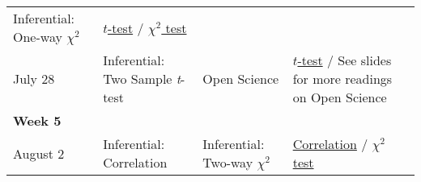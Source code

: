 \documentclass[
]{book}
\begin{document}
\begin{longtable}[]{@{}llll@{}}
\begin{minipage}[t]{0.29\columnwidth}
Inferential: One-way \(\chi^2\)\strut
\end{minipage} & \begin{minipage}[t]{0.18\columnwidth}\raggedright
\href{https://learningstatisticswithr.com/book/ttest.html}{\(t\)-test} / \href{https://learningstatisticswithr.com/book/chisquare.html}{\(\chi^2\) test}\strut
\end{minipage}\tabularnewline
\begin{minipage}[t]{0.09\columnwidth}\raggedright
July 28\strut
\end{minipage} & \begin{minipage}[t]{0.32\columnwidth}\raggedright
Inferential: Two Sample \emph{t}-test\strut
\end{minipage} & \begin{minipage}[t]{0.29\columnwidth}\raggedright
Open Science\strut
\end{minipage} & \begin{minipage}[t]{0.18\columnwidth}\raggedright
\href{https://learningstatisticswithr.com/book/ttest.html}{\(t\)-test} / See slides for more readings on Open Science\strut
\end{minipage}\tabularnewline
\begin{minipage}[t]{0.09\columnwidth}\raggedright
\textbf{Week 5}\strut
\end{minipage} & \begin{minipage}[t]{0.32\columnwidth}\raggedright
\strut
\end{minipage} & \begin{minipage}[t]{0.29\columnwidth}\raggedright
\strut
\end{minipage} & \begin{minipage}[t]{0.18\columnwidth}\raggedright
\strut
\end{minipage}\tabularnewline
\begin{minipage}[t]{0.09\columnwidth}\raggedright
August 2\strut
\end{minipage} & \begin{minipage}[t]{0.32\columnwidth}\raggedright
Inferential: Correlation\strut
\end{minipage} & \begin{minipage}[t]{0.29\columnwidth}\raggedright
Inferential: Two-way \(\chi^2\)\strut
\end{minipage} & \begin{minipage}[t]{0.18\columnwidth}\raggedright
\href{https://learningstatisticswithr.com/book/regression.html\#corrhyp}{Correlation} / \href{https://learningstatisticswithr.com/book/chisquare.html}{\(\chi^2\) test}\strut

\end{minipage}
\end{longtable}
\end{document}
